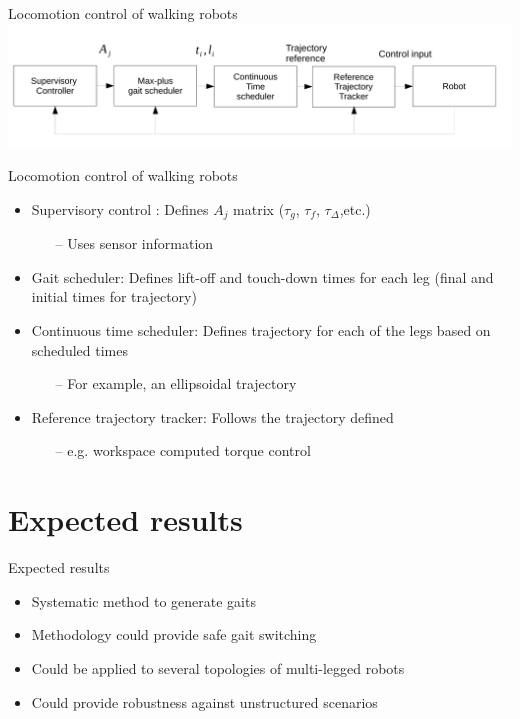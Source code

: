 \documentclass{beamer}
\begin{document}
\begin{frame}{Locomotion control of walking robots}
	\includegraphics[width=1\textwidth]{images/Control.pdf}
\end{frame}

\begin{frame}{Locomotion control of walking robots}
	\begin{itemize}\setlength\itemsep{1.5em}
			\item Supervisory control : Defines $A_j$ matrix ($\tau_g$, $\tau_f$, $\tau_\Delta$,etc.)
				\begin{itemize}
				\item [--] Uses sensor information
				\end{itemize}
			\item Gait scheduler: Defines lift-off and touch-down times for each leg (final and initial times for trajectory)
			\item Continuous time scheduler: Defines trajectory for each of the legs based on scheduled times
				\begin{itemize}
				\item [--] For example, an ellipsoidal trajectory
				\end{itemize}
			\item Reference trajectory tracker: Follows the trajectory defined
				\begin{itemize}
				\item [--] e.g. workspace computed torque control
				\end{itemize}
		\end{itemize}
\end{frame}

\section{Expected results}

\begin{frame}{Expected results}
	\begin{itemize}\setlength\itemsep{1.5em}
		\item Systematic method to generate gaits
		\item Methodology could provide safe gait switching
		\item Could be applied to several topologies of multi-legged robots
		\item Could provide robustness against unstructured scenarios
	\end{itemize}
\end{frame}
\end{document}
